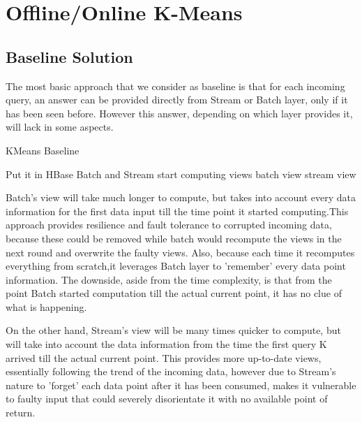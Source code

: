 \documentclass{lmproj}
\begin{document}
\chapter{Offline/Online K-Means}
\label{kmeans}

\section{Baseline Solution}
\label{kmeans}

The most basic approach that we consider as baseline is that for each incoming query, an answer can be provided directly from Stream or Batch layer, only if it has been seen before. However this answer, depending on which layer provides it, will lack in some aspects.

\bigskip
\begin{algorithm}[H]
	\caption{KMeans Baseline}\label{kmeansbaseline}
	\begin{algorithmic}[1]
		
		\State Put it in HBase
		\State Batch and Stream start computing views
		\Else 
		\State \Return batch view
		\State \Return stream view
		\EndIf
		\EndIf			
		
		\EndProcedure
	\end{algorithmic}
\end{algorithm}

Batch's view will take much longer to compute, but takes into account every data information for the first data input till the time point it started computing.This approach provides resilience and fault tolerance to corrupted incoming data, because these could be removed while batch would recompute the views in the next round and overwrite the faulty views. Also, because each time it recomputes everything from scratch,it leverages Batch layer to 'remember' every data point information. The downside, aside from the time complexity, is that from the point Batch started computation till the actual current point, it has no clue of what is happening. 

On the other hand, Stream's view will be many times quicker to compute, but will take into account the data information from the time the first query K arrived till the actual current point. This provides more up-to-date views, essentially following the trend of the incoming data, however due to Stream's nature to 'forget' each data point after it has been consumed, makes it vulnerable to faulty input that could severely disorientate it with no available point of return.
\end{document}
